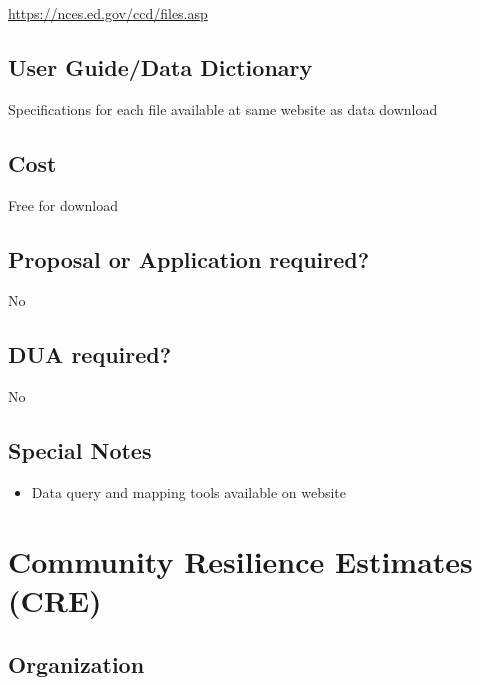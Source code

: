 \documentclass[
]{book}
\providecommand{\tightlist}{%
  \setlength{\itemsep}{0pt}\setlength{\parskip}{0pt}}
\begin{document}
\url{https://nces.ed.gov/ccd/files.asp}

\hypertarget{user-guidedata-dictionary-16}{%
\section{User Guide/Data Dictionary}\label{user-guidedata-dictionary-16}}

Specifications for each file available at same website as data download

\hypertarget{cost-16}{%
\section{Cost}\label{cost-16}}

Free for download

\hypertarget{proposal-or-application-required-16}{%
\section{Proposal or Application required?}\label{proposal-or-application-required-16}}

No

\hypertarget{dua-required-16}{%
\section{DUA required?}\label{dua-required-16}}

No

\hypertarget{special-notes-16}{%
\section{Special Notes}\label{special-notes-16}}

\begin{itemize}
\tightlist
\item
  Data query and mapping tools available on website
\end{itemize}

\mainmatter

\hypertarget{community-resilience-estimates-cre}{%
\chapter{Community Resilience Estimates (CRE)}\label{community-resilience-estimates-cre}}

\hypertarget{organization-17}{%
\section{Organization}\label{organization-17}}
\end{document}
